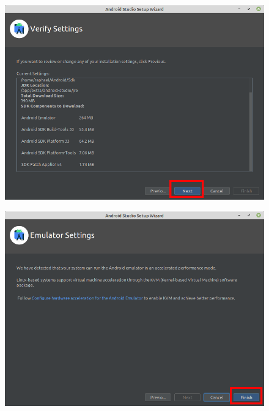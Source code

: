 \documentclass{article}
\begin{document}
\begin{enumerate}
\begin{minipage}{0.5\textwidth}
\begin{figure}[H]
            \includegraphics[scale=0.27]{4.png}
        \end{figure}
        \begin{figure}[H]
            \includegraphics[scale=0.27]{6.png}
        \end{figure}
        \end{minipage}
        

\end{enumerate}
\end{document}
